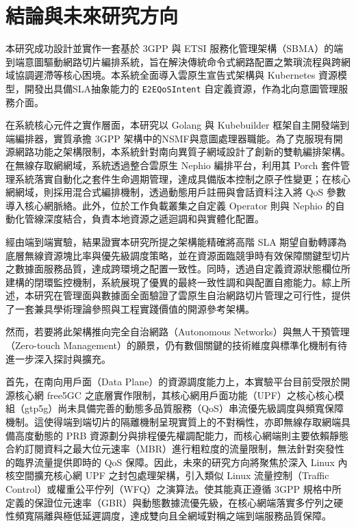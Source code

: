 \chapter{結論與未來研究方向}
\label{sec:future_work}

本研究成功設計並實作一套基於 3GPP 與 ETSI 服務化管理架構（SBMA）的端到端意圖驅動網路切片編排系統，旨在解決傳統命令式網路配置之繁瑣流程與跨網域協調遲滯等核心困境。本系統全面導入雲原生宣告式架構與 Kubernetes 資源模型，開發出具備SLA抽象能力的 \texttt{E2EQoSIntent} 自定義資源，作為北向意圖管理服務介面。

在系統核心元件之實作層面，本研究以 Golang 與 Kubebuilder 框架自主開發端到端編排器，實質承擔 3GPP 架構中的NSMF與意圖處理器職能。為了克服現有開源網路功能之架構限制，本系統針對南向異質子網域設計了創新的雙軌編排架構。在無線存取網網域，系統透過整合雲原生 Nephio 編排平台，利用其 Porch 套件管理系統落實自動化之套件生命週期管理，達成具備版本控制之原子性變更；在核心網網域，則採用混合式編排機制，透過動態用戶註冊與會話資料注入將 QoS 參數導入核心網脈絡。此外，位於工作負載叢集之自定義 Operator 則與 Nephio 的自動化管線深度結合，負責本地資源之遞迴調和與實體化配置。

經由端到端實驗，結果證實本研究所提之架構能精確將高階 SLA 期望自動轉譯為底層無線資源塊比率與優先級調度策略，並在資源面臨競爭時有效保障關鍵型切片之數據面服務品質，達成跨環境之配置一致性。同時，透過自定義資源狀態欄位所建構的閉環監控機制，系統展現了優異的最終一致性調和與配置自癒能力。綜上所述，本研究在管理面與數據面全面驗證了雲原生自治網路切片管理之可行性，提供了一套兼具學術理論參照與工程實踐價值的開源參考架構。

然而，若要將此架構推向完全自治網路（Autonomous Networks）與無人干預管理（Zero-touch Management）的願景，仍有數個關鍵的技術維度與標準化機制有待進一步深入探討與擴充。

首先，在南向用戶面（Data Plane）的資源調度能力上，本實驗平台目前受限於開源核心網 free5GC 之底層實作限制，其核心網用戶面功能（UPF）之核心核心模組（gtp5g）尚未具備完善的動態多品質服務（QoS）串流優先級調度與頻寬保障機制。這使得端到端切片的隔離機制呈現實質上的不對稱性，亦即無線存取網端具備高度動態的 PRB 資源劃分與排程優先權調配能力，而核心網端則主要依賴靜態合約訂閱資料之最大位元速率（MBR）進行粗粒度的流量限制，無法針對突發性的臨界流量提供即時的 QoS 保障。因此，未來的研究方向將聚焦於深入 Linux 內核空間擴充核心網 UPF 之封包處理架構，引入類似 Linux 流量控制（Traffic Control）或權重公平佇列（WFQ）之演算法。使其能真正遵循 3GPP 規格中所定義的保證位元速率（GBR）與動態數據流優先級，在核心網端落實多佇列之硬性頻寬隔離與極低延遲調度，達成雙向且全網域對稱之端到端服務品質保障。

